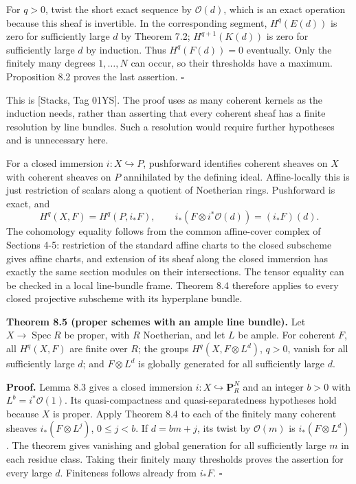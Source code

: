 \documentclass[11pt,a4paper,openany]{report}
\begin{document}
For \(q>0\), twist the short exact sequence by \(\mathcal O(d)\), which is an exact operation because this sheaf is invertible. In the corresponding segment, \(H^q(E(d))\) is zero for sufficiently large \(d\) by Theorem 7.2; \(H^{q+1}(K(d))\) is zero for sufficiently large \(d\) by induction. Thus \(H^q(F(d))=0\) eventually. Only the finitely many degrees \(1,\ldots,N\) can occur, so their thresholds have a maximum. Proposition 8.2 proves the last assertion. \(\square\)

This is {[}Stacks, Tag 01YS{]}. The proof uses as many coherent kernels as the induction needs, rather than asserting that every coherent sheaf has a finite resolution by line bundles. Such a resolution would require further hypotheses and is unnecessary here.

For a closed immersion \(i:X\hookrightarrow P\), pushforward identifies coherent sheaves on \(X\) with coherent sheaves on \(P\) annihilated by the defining ideal. Affine-locally this is just restriction of scalars along a quotient of Noetherian rings. Pushforward is exact, and \[
H^q(X,F)=H^q(P,i_*F),\qquad
i_*(F\otimes i^*\mathcal O(d))=(i_*F)(d).
\] The cohomology equality follows from the common affine-cover complex of Sections 4-5: restriction of the standard affine charts to the closed subscheme gives affine charts, and extension of its sheaf along the closed immersion has exactly the same section modules on their intersections. The tensor equality can be checked in a local line-bundle frame. Theorem 8.4 therefore applies to every closed projective subscheme with its hyperplane bundle.

\textbf{Theorem 8.5 (proper schemes with an ample line bundle).} Let \(X\to\operatorname{Spec}R\) be proper, with \(R\) Noetherian, and let \(L\) be ample. For coherent \(F\), all \(H^q(X,F)\) are finite over \(R\); the groups \(H^q(X,F\otimes L^d)\), \(q>0\), vanish for all sufficiently large \(d\); and \(F\otimes L^d\) is globally generated for all sufficiently large \(d\).

\textbf{Proof.} Lemma 8.3 gives a closed immersion \(i:X\hookrightarrow\mathbf P_R^N\) and an integer \(b>0\) with \(L^b=i^*\mathcal O(1)\). Its quasi-compactness and quasi-separatedness hypotheses hold because \(X\) is proper. Apply Theorem 8.4 to each of the finitely many coherent sheaves \(i_*(F\otimes L^j)\), \(0\le j<b\). If \(d=bm+j\), its twist by \(\mathcal O(m)\) is \(i_*(F\otimes L^d)\). The theorem gives vanishing and global generation for all sufficiently large \(m\) in each residue class. Taking their finitely many thresholds proves the assertion for every large \(d\). Finiteness follows already from \(i_*F\). \(\square\)
\end{document}
